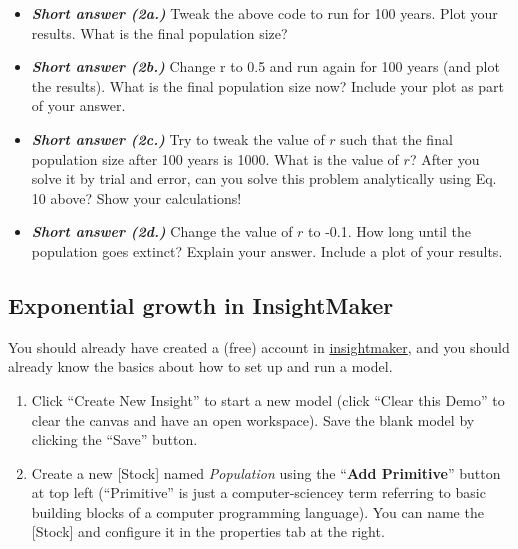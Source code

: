 \documentclass[
]{article}
\begin{document}
\begin{itemize}
\item
  \textbf{\emph{Short answer (2a.)}} Tweak the above code to run for 100
  years. Plot your results. What is the final population size?
\item
  \textbf{\emph{Short answer (2b.)}} Change r to 0.5 and run again for
  100 years (and plot the results). What is the final population size
  now? Include your plot as part of your answer.
\item
  \textbf{\emph{Short answer (2c.)}} Try to tweak the value of \(r\)
  such that the final population size after 100 years is 1000. What is
  the value of \(r\)? After you solve it by trial and error, can you
  solve this problem analytically using Eq. 10 above? Show your
  calculations!
\item
  \textbf{\emph{Short answer (2d.)}} Change the value of \(r\) to -0.1.
  How long until the population goes extinct? Explain your answer.
  Include a plot of your results.
\end{itemize}

\hypertarget{exponential-growth-in-insightmaker}{%
\subsection{Exponential growth in
InsightMaker}\label{exponential-growth-in-insightmaker}}

You should already have created a (free) account in
\href{https://insightmaker.com/}{insightmaker}, and you should already
know the basics about how to set up and run a model.

\begin{enumerate}
\def\labelenumi{\arabic{enumi}.}
\item
  Click ``Create New Insight'' to start a new model (click ``Clear this
  Demo'' to clear the canvas and have an open workspace). Save the blank
  model by clicking the ``Save'' button.
\item
  Create a new {[}Stock{]} named \emph{Population} using the
  ``\textbf{Add Primitive}'' button at top left (``Primitive'' is just a
  computer-sciencey term referring to basic building blocks of a
  computer programming language). You can name the {[}Stock{]} and
  configure it in the properties tab at the right.
\end{enumerate}
\end{document}
